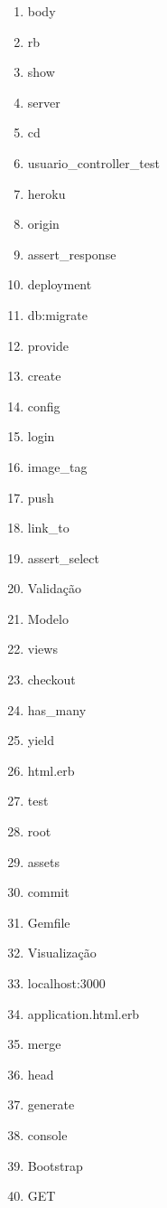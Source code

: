 \documentclass[a4paper,10pt]{article}
\begin{document}
\begin{minipage}[c]{0.2\linewidth}
  \setlength{\leftmargini}{0pt}
  \begin{enumerate}[label=(\textcolor{white}{\PaddingUp*}),itemsep=.1em]
    \item body
    \item rb
    \item show
    \item server
    \item cd
    \item usuario\_controller\_test
    \item heroku
    \item origin
    \item assert\_response
    \item deployment
    \item db:migrate
    \item provide
    \item create
    \item config
    \item login
    \item image\_tag
    \item push
    \item link\_to
    \item assert\_select
    \item Validação
    \item Modelo
    \item views
    \item checkout
    \item has\_many
    \item yield
    \item html.erb
    \item test
    \item root
    \item assets
    \item commit
    \item Gemfile
    \item Visualização
    \item localhost:3000
    \item application.html.erb
    \item merge
    \item head
    \item generate
    \item console
    \item Bootstrap
    \item GET
  \end{enumerate}
\end{minipage}
\end{document}
